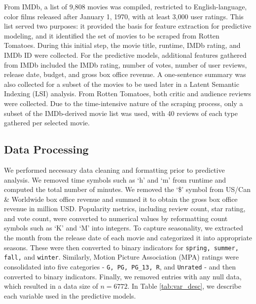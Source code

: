 \documentclass{article}
\begin{document}
From IMDb, a list of 9,808 movies was compiled, restricted to English-language, color films released after January 1, 1970, with at least 3,000 user ratings. This list served two purposes: it provided the basis for feature extraction for predictive modeling, and it identified the set of movies to be scraped from Rotten Tomatoes. During this initial step, the movie title, runtime, IMDb rating, and IMDb ID were collected. For the predictive models, additional features gathered from IMDb included the IMDb rating, number of votes, number of user reviews, release date, budget, and gross box office revenue. A one-sentence summary was also collected for a subset of the movies to be used later in a Latent Semantic Indexing (LSI) analysis. From Rotten Tomatoes, both critic and audience reviews were collected. Due to the time-intensive nature of the scraping process, only a subset of the IMDb-derived movie list was used, with 40 reviews of each type gathered per selected movie.

\subsection{Data Processing}
We performed necessary data cleaning and formatting prior to predictive analysis. We removed time symbols such as `h' and `m' from runtime and computed the total number of minutes. We removed the `\$' symbol from US/Can \& Worldwide box office revenue and summed it to obtain the gross box office revenue in million USD. Popularity metrics, including  review count, star rating, and vote count, were converted to numerical values by reformatting count symbols such as `K' and `M' into integers. To capture seasonality, we extracted the month from the release date of each movie and categorized it into appropriate seasons. These were then converted to binary indicators for \texttt{spring, summer, fall,} and \texttt{winter}. Similarly, Motion Picture Association (MPA) ratings were consolidated into five categories - \texttt{G, PG, PG\_13, R}, and \texttt{Unrated} - and then converted to binary indicators. Finally, we removed entries with any null data, which resulted in a data size of $n=6772$. In Table \ref{tab:var_desc}, we describe each variable used in the predictive models.
\end{document}

